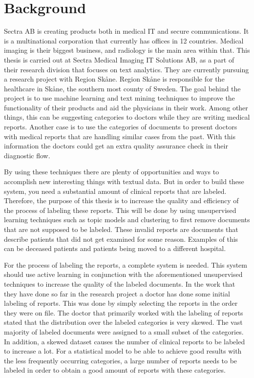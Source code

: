 \chapter{Background}
\label{cha:background}

Sectra AB is creating products both in medical IT and secure communications.
It is a multinational corporation that currently has offices in 12 countries.
Medical imaging is their biggest business, and radiology is the main area within that.
This thesis is carried out at Sectra Medical Imaging IT Solutions AB, as a part of their research division that focuses on text analytics.
They are currently pursuing a research project with Region Skåne.
Region Skåne is responsible for the healthcare in Skåne, the southern most county of Sweden.
The goal behind the project is to use machine learning and text mining techniques to improve the functionality of their products and aid the physicians in their work.
Among other things, this can be suggesting categories to doctors while they are writing medical reports.
Another case is to use the categories of documents to present doctors with medical reports that are handling similar cases from the past.
With this information the doctors could get an extra quality assurance check in their diagnostic flow.

By using these techniques there are plenty of opportunities and ways to accomplish new interesting things with textual data.
But in order to build these system, you need a substantial amount of clinical reports that are labeled.
Therefore, the purpose of this thesis is to increase the quality and efficiency of the process of labeling these reports.
This will be done by using unsupervised learning techniques such as topic models and clustering to first remove documents that are not supposed to be labeled.
These invalid reports are documents that describe patients that did not get examined for some reason.
Examples of this can be deceased patients and patients being moved to a different hospital.

For the process of labeling the reports, a complete system is needed.
This system should use active learning in conjunction with the aforementioned unsupervised techniques to increase the quality of the labeled documents.
In the work that they have done so far in the research project a doctor has done some initial labeling of reports.
This was done by simply selecting the reports in the order they were on file.
The doctor that primarily worked with the labeling of reports stated that the distribution over the labeled categories is very skewed.
The vast majority of labeled documents were assigned to a small subset of the categories.
In addition, a skewed dataset causes the number of clinical reports to be labeled to increase a lot.
For a statistical model to be able to achieve good results with the less frequently occurring categories, a large number of reports needs to be labeled in order to obtain a good amount of reports with these categories.

